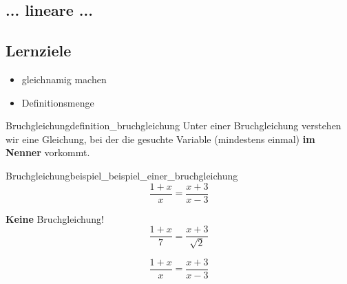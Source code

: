 
\subsection{... lineare ...}






\subsection*{Lernziele}

\begin{itemize}
	\item gleichnamig machen
  \item Definitionsmenge
\end{itemize}

\begin{definition}{Bruchgleichung}{definition_bruchgleichung}
  Unter einer Bruchgleichung verstehen wir eine Gleichung, bei der die
  gesuchte Variable (mindestens einmal) \textbf{im Nenner} vorkommt.
\end{definition}

\begin{beispiel}{Bruchgleichung}{beispiel_beispiel_einer_bruchgleichung}
$$\frac{1+x}{x}=\frac{x+3}{x-3}$$
\end{beispiel}

\begin{bemerkung}{\textbf{Keine} Bruchgleichung!}{}
$$\frac{1+x}7=\frac{x+3}{\sqrt{2}}$$
  \end{bemerkung}
\newpage

$$\frac{1+x}{x}=\frac{x+3}{x-3}$$
  
